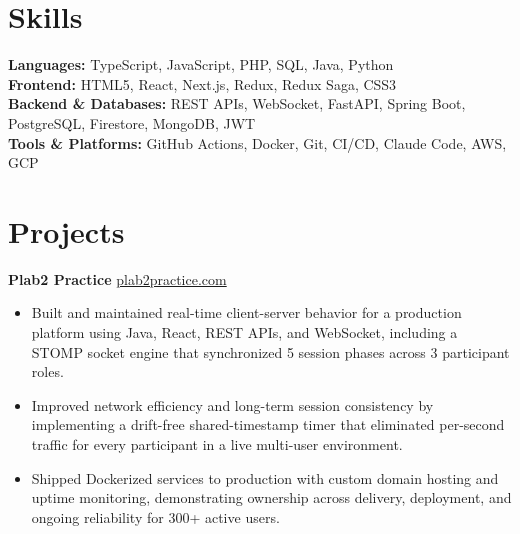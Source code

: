 \documentclass[11pt]{article}       %
\begin{document}
\vspace{-10.5pt}

\section*{Skills}
\textbf{Languages:} TypeScript, JavaScript, PHP, SQL, Java, Python \\
\textbf{Frontend:} HTML5, React, Next.js, Redux, Redux Saga, CSS3 \\
\textbf{Backend \& Databases:} REST APIs, WebSocket, FastAPI, Spring Boot, PostgreSQL, Firestore, MongoDB, JWT \\
\textbf{Tools \& Platforms:} GitHub Actions, Docker, Git, CI/CD, Claude Code, AWS, GCP
\vspace{-5pt}






\section*{Projects}
\textbf{Plab2 Practice} \hfill \href{https://plab2practice.com}{plab2practice.com} \\
\vspace{-9pt}
\begin{itemize}
  \item Built and maintained real-time client-server behavior for a production platform using Java, React, REST APIs, and WebSocket, including a STOMP socket engine that synchronized 5 session phases across 3 participant roles.
  \item Improved network efficiency and long-term session consistency by implementing a drift-free shared-timestamp timer that eliminated per-second traffic for every participant in a live multi-user environment.
  \item Shipped Dockerized services to production with custom domain hosting and uptime monitoring, demonstrating ownership across delivery, deployment, and ongoing reliability for 300+ active users.
\end{itemize}
\end{document}
